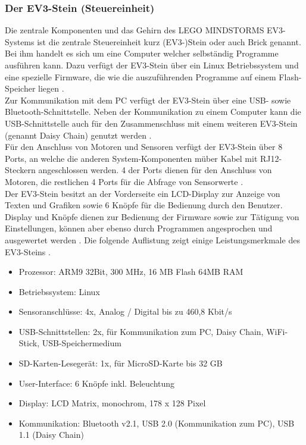 \subsubsection{Der EV3-Stein (Steuereinheit)}
\color{finishing}
Die zentrale Komponenten und das Gehirn des LEGO MINDSTORMS EV3-Systems ist die zentrale Steuereinheit kurz (EV3-)Stein oder auch Brick genannt. Bei ihm handelt
es sich um eine Computer welcher selbständig Programme ausführen kann. Dazu verfügt der EV3-Stein über 
ein Linux Betriebssystem und eine spezielle Firmware, die wie die auszuführenden Programme auf einem Flash-Speicher liegen \cite[vgl.][21]{Scholz.DasEV3}. \\
Zur Kommunikation mit dem PC verfügt der EV3-Stein über eine USB- sowie Bluetooth-Schnittstelle. Neben der 
Kommunikation zu einem Computer kann die USB-Schnittstelle auch für den Zusammenschluss mit einem weiteren EV3-Stein (genannt Daisy Chain) 
genutzt werden \cite[vgl.][Seite 21]{Scholz.DasEV3}.  \\
Für den Anschluss von Motoren und Sensoren verfügt der EV3-Stein über 8 Ports, an welche die anderen System-Komponenten müber Kabel mit RJ12-Steckern angeschlossen werden. 4 der Ports dienen für den Anschluss von
Motoren, die restlichen 4 Ports für die Abfrage von Sensorwerte \cite[vgl.][21]{Scholz.DasEV3}.  \\
Der EV3-Stein besitzt an der Vorderseite ein LCD-Display zur Anzeige von Texten und Grafiken sowie  
6 Knöpfe für die Bedienung durch den Benutzer. Display und Knöpfe dienen zur Bedienung der Firmware sowie zur Tätigung von Einstellungen, können aber ebenso durch Programmen angesprochen und ausgewertet werden \cite[vgl.][21]{Scholz.DasEV3}. 
\smallskip
\newline
Die folgende Auflistung zeigt einige Leistungsmerkmale des EV3-Steins \citep[vgl.][Seite 23 f., Seite 32]{Scholz.DasEV3, Schobel.RobertaEV3Programmieren}.
\begin{itemize}
	\item{Prozessor:} ARM9 32Bit, 300 MHz, 16 MB Flash 64MB RAM
	\item{Betriebssystem:} Linux
	\item{Sensoranschlüsse:} 4x, Analog / Digital bis zu 460,8 Kbit/s
	\item{USB-Schnittstellen:} 2x, für Kommunikation zum PC, Daisy Chain, WiFi-Stick, USB-Speichermedium
	\item{SD-Karten-Lesegerät:} 1x, für MicroSD-Karte bis 32 GB
	\item{User-Interface:} 6 Knöpfe inkl. Beleuchtung
	\item{Display:} LCD Matrix, monochrom, 178 x 128 Pixel
	\item{Kommunikation:} Bluetooth v2.1, USB 2.0 (Kommunikation zum PC), USB 1.1 (Daisy Chain)
\end{itemize}
